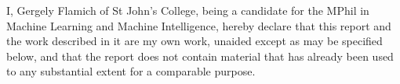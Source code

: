 
\begin{declaration}


\noindent I, Gergely Flamich of St John's College, being a candidate for the
MPhil in Machine Learning and Machine Intelligence, hereby declare that this
report and the work described in it are my own work, unaided except as may be
specified below, and that the report does not contain material that has
already been used to any substantial extent for a comparable purpose.


\end{declaration}


